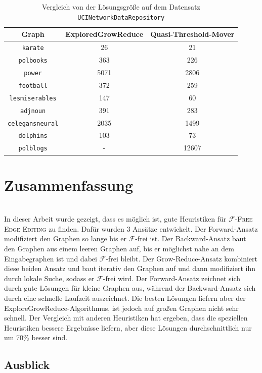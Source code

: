 \documentclass[12pt,a4paper,onecolumn,oneside,titlepage]{article}
\newcommand{\vars}{\texttt}
\newcommand\cursive[1]{\ensuremath{\mathcal{#1}}}
\begin{document}
\begin{table}
\centering
\begin{tabular}{c cc}
Graph & \textbf{ExploredGrowReduce} & \textbf{Quasi-Threshold-Mover} \\ 
\hline 
\vars{karate} & 26 & 21 \\
\vars{polbooks} & 363 & 226 \\
\vars{power} & 5071 & 2806 \\
\vars{football} & 372 & 259 \\
\vars{lesmiserables} & 147 & 60 \\
\vars{adjnoun} & 391 & 283\\
\vars{celegansneural} & 2035 & 1499 \\
\vars{dolphins} & 103 & 73 \\
\vars{polblogs} & - & 12607 \\
\end{tabular} 
\caption{Vergleich von der Lösungsgröße auf dem Datensatz \vars{UCINetworkDataRepository}}
\label{tab:uci}
\end{table}


\section{Zusammenfassung}\\
In dieser Arbeit wurde gezeigt, dass es möglich ist, gute Heuristiken für \textsc{\cursive{F}-Free Edge Editing} zu finden. Dafür wurden 3 Ansätze entwickelt. Der Forward-Ansatz modifiziert den Graphen so lange bis er \cursive{F}-frei ist. Der Backward-Ansatz baut den Graphen aus einem leeren Graphen auf, bis er möglichst nahe an dem Eingabegraphen ist und dabei \cursive{F}-frei bleibt. Der Grow-Reduce-Ansatz kombiniert diese beiden Ansatz und baut iterativ den Graphen auf und dann modifiziert ihn durch lokale Suche, sodass er \cursive{F}-frei wird. Der Forward-Ansatz zeichnet sich durch gute Lösungen für kleine Graphen aus, während der Backward-Ansatz sich durch eine schnelle Laufzeit auszeichnet. Die besten Lösungen liefern aber der ExploreGrowReduce-Algorithmus, ist jedoch auf großen Graphen nicht sehr schnell.
Der Vergleich mit anderen Heuristiken hat ergeben, dass die speziellen Heuristiken bessere Ergebnisse liefern, aber diese Lösungen durchschnittlich nur um 70\% besser sind.



\subsection{Ausblick}
\end{document}
